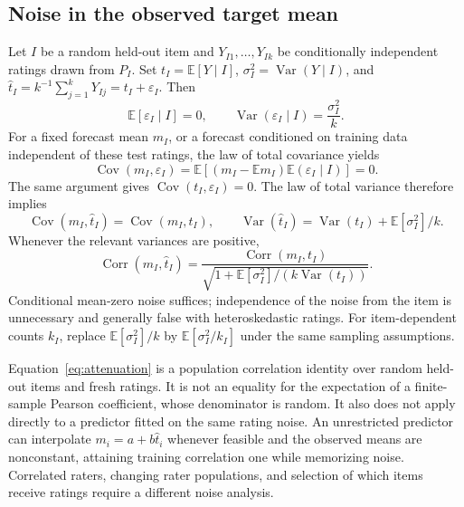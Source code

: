 \documentclass[11pt,letterpaper]{article}
\newcommand{\Var}{\operatorname{Var}}
\newcommand{\Cov}{\operatorname{Cov}}
\newcommand{\E}{\mathbb{E}}
\begin{document}
\subsection{Noise in the observed target mean}
Let $I$ be a random held-out item and $Y_{I1},\ldots,Y_{Ik}$ be conditionally independent ratings drawn from $P_I$.
Set $t_I=\E[Y\mid I]$, $\sigma_I^2=\Var(Y\mid I)$, and $\widehat t_I=k^{-1}\sum_{j=1}^kY_{Ij}=t_I+\varepsilon_I$.
Then
\[
 \E[\varepsilon_I\mid I]=0,\qquad \Var(\varepsilon_I\mid I)=\frac{\sigma_I^2}{k}.
\]
For a fixed forecast mean $m_I$, or a forecast conditioned on training data independent of these test ratings, the law of total covariance yields
\[
 \Cov(m_I,\varepsilon_I)=\E[(m_I-\E m_I)\E(\varepsilon_I\mid I)]=0.
\]
The same argument gives $\Cov(t_I,\varepsilon_I)=0$.
The law of total variance therefore implies
\[
 \Cov(m_I,\widehat t_I)=\Cov(m_I,t_I),\qquad
 \Var(\widehat t_I)=\Var(t_I)+\E[\sigma_I^2]/k.
\]
Whenever the relevant variances are positive,
\begin{equation}\label{eq:attenuation}
 \operatorname{Corr}(m_I,\widehat t_I)
 =\frac{\operatorname{Corr}(m_I,t_I)}{\sqrt{1+\E[\sigma_I^2]/(k\Var(t_I))}}.
\end{equation}
Conditional mean-zero noise suffices; independence of the noise from the item is unnecessary and generally false with heteroskedastic ratings.
For item-dependent counts $k_I$, replace $\E[\sigma_I^2]/k$ by $\E[\sigma_I^2/k_I]$ under the same sampling assumptions.

Equation~\eqref{eq:attenuation} is a population correlation identity over random held-out items and fresh ratings.
It is not an equality for the expectation of a finite-sample Pearson coefficient, whose denominator is random.
It also does not apply directly to a predictor fitted on the same rating noise.
An unrestricted predictor can interpolate $m_i=a+b\widehat t_i$ whenever feasible and the observed means are nonconstant, attaining training correlation one while memorizing noise.
Correlated raters, changing rater populations, and selection of which items receive ratings require a different noise analysis.
\end{document}
